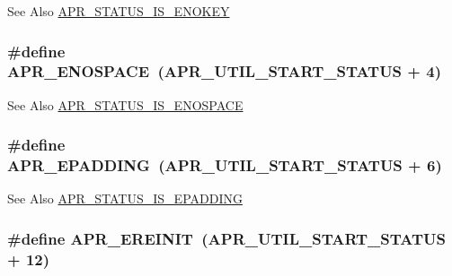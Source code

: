 \begin{DoxySeeAlso}{See Also}
\hyperlink{group___a_p_r___util___error_ga060055dd2eb82e8450015fa2fae5f87c}{A\-P\-R\-\_\-\-S\-T\-A\-T\-U\-S\-\_\-\-I\-S\-\_\-\-E\-N\-O\-K\-E\-Y} 
\end{DoxySeeAlso}
\hypertarget{group___a_p_r___util___error_gaec7a912cf8fe5f964ad8fbbafaff0241}{
\subsubsection[{A\-P\-R\-\_\-\-E\-N\-O\-S\-P\-A\-C\-E}]{\setlength{\rightskip}{0pt plus 5cm}\#define A\-P\-R\-\_\-\-E\-N\-O\-S\-P\-A\-C\-E~(A\-P\-R\-\_\-\-U\-T\-I\-L\-\_\-\-S\-T\-A\-R\-T\-\_\-\-S\-T\-A\-T\-U\-S + 4)}}\label{group___a_p_r___util___error_gaec7a912cf8fe5f964ad8fbbafaff0241}
\begin{DoxySeeAlso}{See Also}
\hyperlink{group___a_p_r___util___error_ga32f4e4d4cff641d33acf3cb722e36b1f}{A\-P\-R\-\_\-\-S\-T\-A\-T\-U\-S\-\_\-\-I\-S\-\_\-\-E\-N\-O\-S\-P\-A\-C\-E} 
\end{DoxySeeAlso}
\hypertarget{group___a_p_r___util___error_gae7c077d0539cafc19917c12174ed961d}{
\subsubsection[{A\-P\-R\-\_\-\-E\-P\-A\-D\-D\-I\-N\-G}]{\setlength{\rightskip}{0pt plus 5cm}\#define A\-P\-R\-\_\-\-E\-P\-A\-D\-D\-I\-N\-G~(A\-P\-R\-\_\-\-U\-T\-I\-L\-\_\-\-S\-T\-A\-R\-T\-\_\-\-S\-T\-A\-T\-U\-S + 6)}}\label{group___a_p_r___util___error_gae7c077d0539cafc19917c12174ed961d}
\begin{DoxySeeAlso}{See Also}
\hyperlink{group___a_p_r___util___error_ga4e1e34448470111b935efafda1248628}{A\-P\-R\-\_\-\-S\-T\-A\-T\-U\-S\-\_\-\-I\-S\-\_\-\-E\-P\-A\-D\-D\-I\-N\-G} 
\end{DoxySeeAlso}
\hypertarget{group___a_p_r___util___error_ga161b8a0f8e24033e8cd5d9068d524f00}{
\subsubsection[{A\-P\-R\-\_\-\-E\-R\-E\-I\-N\-I\-T}]{\setlength{\rightskip}{0pt plus 5cm}\#define A\-P\-R\-\_\-\-E\-R\-E\-I\-N\-I\-T~(A\-P\-R\-\_\-\-U\-T\-I\-L\-\_\-\-S\-T\-A\-R\-T\-\_\-\-S\-T\-A\-T\-U\-S + 12)}}\label{group___a_p_r___util___error_ga161b8a0f8e24033e8cd5d9068d524f00}
